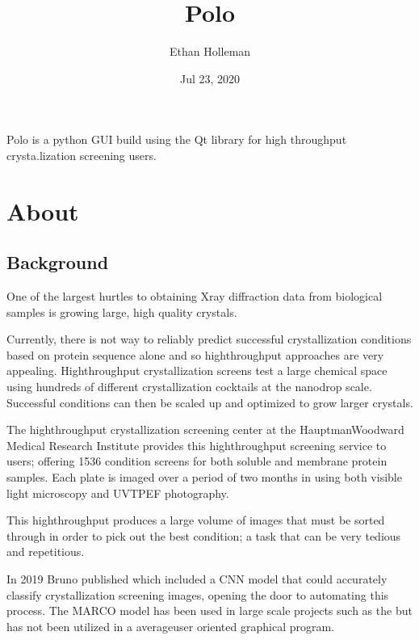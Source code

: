 \documentclass[letterpaper,10pt,english]{sphinxmanual}
\title{Polo}
\date{Jul 23, 2020}
\author{Ethan Holleman}
\begin{document}
\pagestyle{empty}
\sphinxmaketitle
\pagestyle{plain}
\sphinxtableofcontents
\pagestyle{normal}
\label{\detokenize{index::doc}}


Polo is a python GUI build using the Qt library for
high throughput crysta.lization screening users.


\chapter{About}
\label{\detokenize{about:about}}\label{\detokenize{about::doc}}

\section{Background}
\label{\detokenize{about:background}}
One of the largest hurtles to obtaining X\sphinxhyphen{}ray diffraction
data from biological samples is growing large, high quality crystals.

Currently, there is not way to reliably predict successful crystallization
conditions based on protein sequence alone and so high\sphinxhyphen{}throughput approaches
are very appealing. High\sphinxhyphen{}throughput crystallization screens test a large
chemical space using hundreds of different crystallization cocktails at the
nano\sphinxhyphen{}drop scale. Successful conditions can then be scaled up and optimized to
grow larger crystals.

The high\sphinxhyphen{}throughput crystallization screening center at the Hauptman\sphinxhyphen{}Woodward
Medical Research Institute provides this high\sphinxhyphen{}throughput screening service to
users; offering 1536 condition screens for both soluble and membrane protein
samples. Each plate is imaged over a period of two months in using both
visible light microscopy and UV\sphinxhyphen{}TPEF photography.

This high\sphinxhyphen{}throughput produces a large volume of images that must be
sorted through in order to pick out the best condition; a task that can be
very tedious and repetitious.

In 2019 Bruno  published 
which included a CNN model that could accurately classify crystallization screening
images, opening the door to automating this process. The MARCO model has been
used in large scale projects such as the 
but has not been utilized in a average\sphinxhyphen{}user oriented graphical program.
\end{document}
